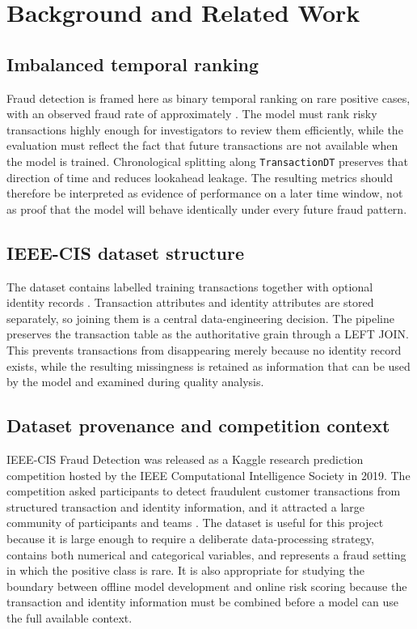 \chapter{Background and Related Work}
\label{chap:background}

\section{Imbalanced temporal ranking}

Fraud detection is framed here as binary temporal ranking on rare positive cases, with an observed fraud rate of approximately . The model must rank risky transactions highly enough for investigators to review them efficiently, while the evaluation must reflect the fact that future transactions are not available when the model is trained. Chronological splitting along \texttt{TransactionDT} preserves that direction of time and reduces lookahead leakage. The resulting metrics should therefore be interpreted as evidence of performance on a later time window, not as proof that the model will behave identically under every future fraud pattern.

\section{IEEE-CIS dataset structure}

The dataset contains  labelled training transactions together with optional identity records \parencite{ieeecis2019}. Transaction attributes and identity attributes are stored separately, so joining them is a central data-engineering decision. The pipeline preserves the transaction table as the authoritative grain through a LEFT JOIN. This prevents transactions from disappearing merely because no identity record exists, while the resulting missingness is retained as information that can be used by the model and examined during quality analysis.

\section{Dataset provenance and competition context}

IEEE-CIS Fraud Detection was released as a Kaggle research prediction
competition hosted by the IEEE Computational Intelligence Society in 2019.
The competition asked participants to detect fraudulent customer transactions
from structured transaction and identity information, and it attracted a large
community of participants and teams \parencite{ieeecis2019}. The dataset is
useful for this project because it is large enough to require a deliberate
data-processing strategy, contains both numerical and categorical variables,
and represents a fraud setting in which the positive class is rare. It is also
appropriate for studying the boundary between offline model development and
online risk scoring because the transaction and identity information must be
combined before a model can use the full available context.

